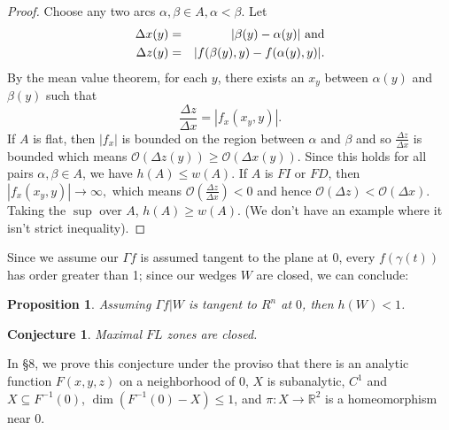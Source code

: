 \documentclass[article]{amsart}
\newtheorem{proposition}[theorem]{Proposition}
\newtheorem{conjecture}[theorem]{Conjecture}
\newcommand{\R}{\mathbb R}
\newcommand{\0}{{\bf 0}}
\begin{document}
\begin{proof}
Choose any two arcs $\alpha, \beta \in A, \alpha < \beta$.  Let
\begin{eqnarray*} 
\Delta x(y) &=& |\beta(y) - \alpha(y)| \ {\rm and}\\
\Delta z(y) &=& |f(\beta(y), y) - f(\alpha (y), y)|.
\end{eqnarray*}
By the mean value theorem, for each $y$, there exists an $x_y$ between $\alpha (y)$ and
$\beta (y)$ such that
$$\frac{\Delta z}{\Delta x} = |f_x(x_y, y)|.$$
If $A$ is flat, then $|f_x|$ is bounded on the region between $\alpha$ and $\beta$ and so
$\frac{\Delta z}{\Delta x}$  is bounded which means $\mathcal{O}(\Delta z(y)) \ge \mathcal{O}(\Delta x(y))$. Since this holds for all pairs 
$\alpha, \beta \in A$, we have $h(A) \le w(A)$.  If $A$ is $FI$ or $FD$, then 
$|f_x(x_y, y)| \rightarrow \infty,$ which means $\mathcal{O}(\frac{\Delta z}{\Delta x}) < 0$ 
and hence $\mathcal{O}(\Delta z) < \mathcal{O}(\Delta x)$.  Taking the $\sup$ over $A$, $h(A) \ge w(A)$.  (We don't have an example where it isn't strict inequality).
\end{proof}

Since we assume our $\Gamma f$ is assumed tangent to the plane at $0$, every $f(\gamma (t)) $ has order greater than 1; since our wedges $W$ are closed, we can conclude:

\begin{proposition}  Assuming $\Gamma f|W $ is tangent to $R^n$ at $0$, then $h(W)<1$.

\end{proposition}

\begin{conjecture} Maximal $FL$ zones are closed.  
\end{conjecture}

In \S 8,  we prove this conjecture under the proviso that there is   an analytic function $F(x,y,z)$ on a neighborhood of $0$, $X$ is subanalytic, $C^1$ and $X\subseteq F^{-1}(0)$,  $\dim{(F^{-1}(0) - X)}\le 1$, and $\pi: X\rightarrow \R^2$ is a homeomorphism near 0. 

\end{document}
